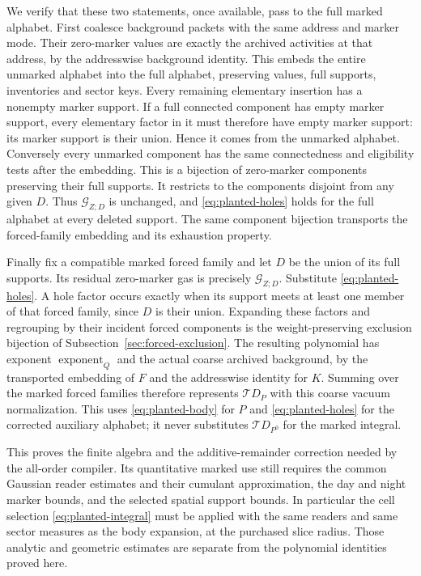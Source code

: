 We verify that these two statements, once available, pass to the full
marked alphabet. First coalesce background packets with the same
address and marker mode. Their zero-marker values are exactly the
archived activities at that address, by the addresswise background
identity. This embeds the entire unmarked alphabet into the full
alphabet, preserving values, full supports, inventories and sector
keys. Every remaining elementary insertion has a nonempty marker
support. If a full connected component has empty marker support,
every elementary factor in it must therefore have empty marker
support: its marker support is their union. Hence it comes from the
unmarked alphabet. Conversely every unmarked component has the same
connectedness and eligibility tests after the embedding. This is a
bijection of zero-marker components preserving their full supports.
It restricts to the components disjoint from any given $D$. Thus
$\mathcal G_{Z;D}$ is unchanged, and \eqref{eq:planted-holes} holds
for the full alphabet at every deleted support. The same component
bijection transports the forced-family embedding and its exhaustion
property.

Finally fix a compatible marked forced family and let $D$ be the union
of its full supports. Its residual zero-marker gas is precisely
$\mathcal G_{Z;D}$. Substitute \eqref{eq:planted-holes}. A hole factor
occurs exactly when its support meets at least one member of that forced
family, since $D$ is their union. Expanding these factors and regrouping
by their incident forced components is the weight-preserving exclusion
bijection of Subsection~\ref{sec:forced-exclusion}. The resulting polynomial
has exponent $\operatorname{exponent}_Q$ and the actual coarse archived
background, by the transported embedding of $F$ and the addresswise
identity for $K$. Summing over the
marked forced families therefore represents $\mathcal T D_P$ with this
coarse vacuum normalization. This uses \eqref{eq:planted-body} for $P$
and \eqref{eq:planted-holes} for the corrected auxiliary alphabet; it
never substitutes $\mathcal T D_{P^0}$ for the marked integral.

This proves the finite algebra and the additive-remainder correction
needed by the all-order compiler. Its quantitative marked use still
requires the common Gaussian reader estimates and their cumulant
approximation, the day and night marker bounds, and the selected
spatial support bounds. In particular the cell selection
\eqref{eq:planted-integral} must be applied with the same readers and
same sector measures as the body expansion, at the purchased slice
radius. Those analytic and geometric estimates are separate from the
polynomial identities proved here.
